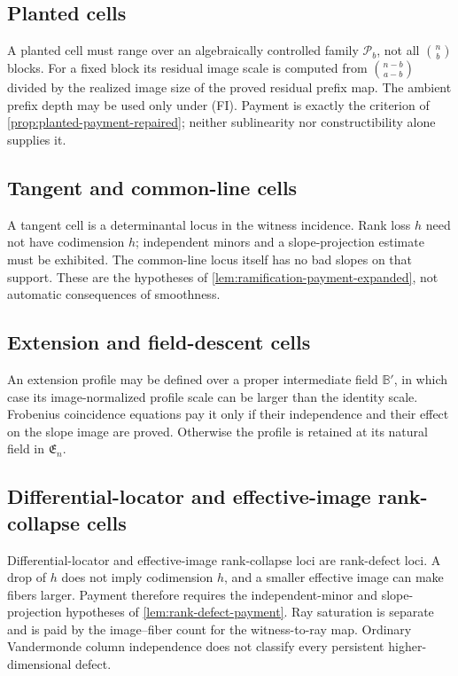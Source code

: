 \documentclass[12pt,a4paper]{amsart}
\numberwithin{equation}{section}
\theoremstyle{remark}
\newcommand{\B}{\mathbb B}
\newcommand{\Pcal}{\mathcal P}
\begin{document}
\subsection*{Planted cells}
A planted cell must range over an algebraically controlled family
\(\Pcal_b\), not all \(\binom nb\) blocks.  For a fixed block its residual
image scale is computed from \(\binom{n-b}{a-b}\) divided by the realized
image size of the proved residual prefix map.  The ambient prefix depth may
be used only under \textup{(FI)}.  Payment is exactly the criterion of
\cref{prop:planted-payment-repaired}; neither sublinearity nor
constructibility alone supplies it.

\subsection*{Tangent and common-line cells}
A tangent cell is a determinantal locus in the witness incidence.  Rank
loss \(h\) need not have codimension \(h\); independent minors and a
slope-projection estimate must be exhibited.  The common-line locus itself
has no bad slopes on that support.  These are the hypotheses of
\cref{lem:ramification-payment-expanded}, not automatic consequences of
smoothness.

\subsection*{Extension and field-descent cells}
An extension profile may be defined over a proper intermediate field
\(\B'\), in which case its image-normalized profile scale can be larger
than the identity scale.  Frobenius coincidence equations pay it only if their
independence and their effect on the slope image are proved.  Otherwise the
profile is retained at its natural field in \(\mathfrak E_n\).

\subsection*{Differential-locator and effective-image rank-collapse cells}
Differential-locator and effective-image rank-collapse loci are rank-defect
loci.  A drop of
\(h\) does not imply codimension \(h\), and a smaller effective image can
make fibers larger.  Payment therefore requires the independent-minor and
slope-projection hypotheses of \cref{lem:rank-defect-payment}.  Ray
saturation is separate and is paid by the image--fiber count for the
witness-to-ray map.  Ordinary
Vandermonde column independence does not classify every persistent
higher-dimensional defect.
\end{document}
